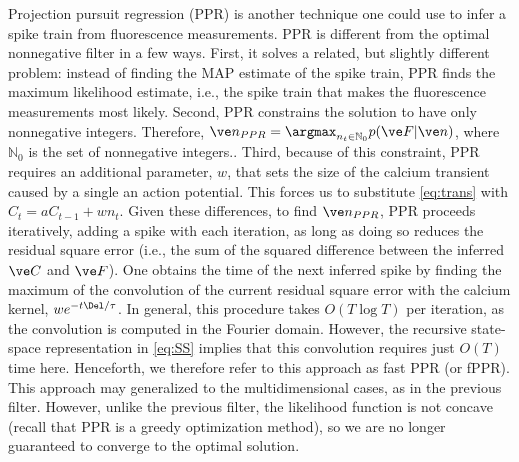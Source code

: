Projection pursuit regression (PPR) is another technique one could use to infer a spike train from fluorescence measurements.  PPR is different from the optimal nonnegative filter in a few ways.  First, it solves a related, but slightly different problem: instead of finding the MAP estimate of the spike train, PPR finds the maximum likelihood estimate, i.e., the spike train that makes the fluorescence measurements most likely.  Second, PPR constrains the solution to have only nonnegative integers. Therefore, $\zT_{PPR}=\argmax_{n_t \in \mathbb{N}_0} p(\FT | \zT)$, where $\mathbb{N}_0$ is the set of nonnegative integers.. 
%
%
Third, because of this constraint, PPR requires an additional parameter, $w$, that sets the size of the calcium transient caused by a single an action potential.  This forces us to substitute \eqref{eq:trans}  with $C_t = a C_{t-1} + w n_t$.  %
%
%
%
Given these differences, to find $\zT_{PPR}$, PPR proceeds iteratively, adding a spike with each iteration, as long as doing so reduces the residual square error (i.e., the sum of the squared difference between the inferred $\xT$ and $\FT$). One obtains the time of the next inferred spike by finding the maximum of the convolution of the current residual square error with the calcium kernel, $w e^{-t\Del/\tau}$. In general, this procedure takes $O(T \log T)$ per iteration, as the convolution is computed in the Fourier domain.  However, the recursive state-space representation in \eqref{eq:SS} implies that this convolution requires just $O(T)$ time here.  Henceforth, we therefore refer to this approach as fast PPR (or fPPR). This approach may generalized to the multidimensional cases, as in the previous filter. However, unlike the previous filter, the likelihood function is not concave (recall that PPR is a greedy optimization method), so we are no longer guaranteed to converge to the optimal solution. %

